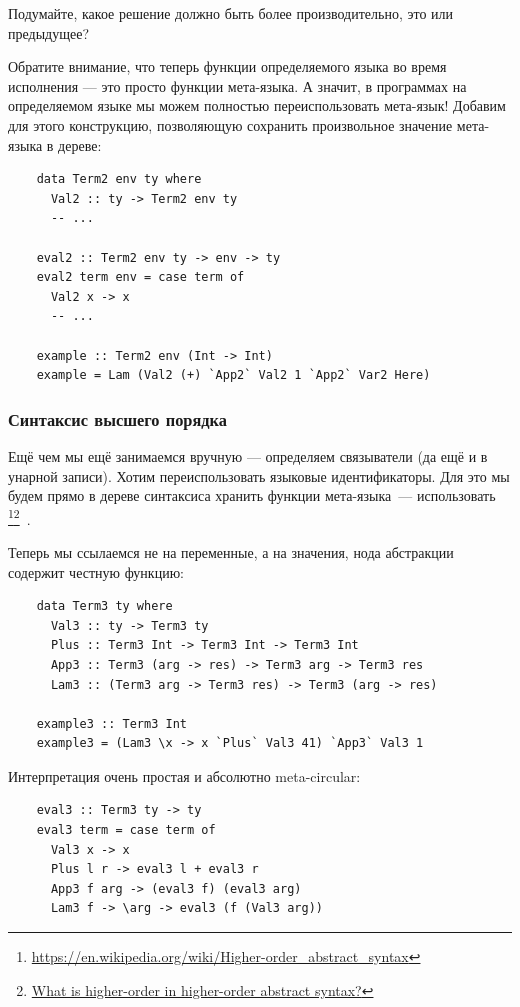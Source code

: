 \begin{task}
    Подумайте, какое решение должно быть более производительно, это или предыдущее?
\end{task}

Обратите внимание, что теперь функции определяемого языка во время исполнения --- это просто функции мета-языка.
А значит, в программах на определяемом языке мы можем полностью переиспользовать мета-язык!
Добавим для этого конструкцию, позволяющую сохранить произвольное значение мета-языка в дереве:
\begin{verbatim}
    data Term2 env ty where
      Val2 :: ty -> Term2 env ty
      -- ...

    eval2 :: Term2 env ty -> env -> ty
    eval2 term env = case term of
      Val2 x -> x
      -- ...

    example :: Term2 env (Int -> Int)
    example = Lam (Val2 (+) `App2` Val2 1 `App2` Var2 Here)
\end{verbatim}

\subsubsection{Синтаксис высшего порядка} \label{subsubsec:h-syntax}

Ещё чем мы ещё занимаемся вручную --- определяем связыватели (да ещё и в унарной записи).
Хотим переиспользовать языковые идентификаторы.
Для это мы будем прямо в дереве синтаксиса хранить функции мета-языка~--- использовать \footnote{\url{https://en.wikipedia.org/wiki/Higher-order_abstract_syntax}}\footnote{\href{https://cstheory.stackexchange.com/questions/20071/what-is-higher-order-in-higher-order-abstract-syntax}{What is higher-order in higher-order abstract syntax?}}~\cite{pfenning1988higher}.

Теперь мы ссылаемся не на переменные, а на значения, нода абстракции содержит честную функцию:
\begin{verbatim}
    data Term3 ty where
      Val3 :: ty -> Term3 ty
      Plus :: Term3 Int -> Term3 Int -> Term3 Int
      App3 :: Term3 (arg -> res) -> Term3 arg -> Term3 res
      Lam3 :: (Term3 arg -> Term3 res) -> Term3 (arg -> res)

    example3 :: Term3 Int
    example3 = (Lam3 \x -> x `Plus` Val3 41) `App3` Val3 1
\end{verbatim}

Интерпретация очень простая и абсолютно meta-circular:
\begin{verbatim}
    eval3 :: Term3 ty -> ty
    eval3 term = case term of
      Val3 x -> x
      Plus l r -> eval3 l + eval3 r
      App3 f arg -> (eval3 f) (eval3 arg)
      Lam3 f -> \arg -> eval3 (f (Val3 arg))
\end{verbatim}

